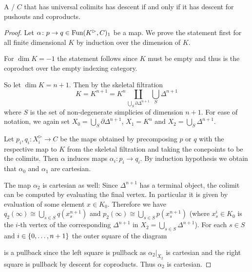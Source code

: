 \begin{lemma}\label{lem:descentIffDescentPoAndCoprod}
    A \inftycat/ $C$ that has universal colimits has descent if and only if it has descent for pushouts and coproducts.
    \begin{proof} %
        Let $\alpha\colon p\to q\in\operatorname{Fun}(K^{\rhd},C)_1$ be a map.
        We prove the statement first for all finite dimensional $K$ by induction over the dimension of $K$. %

        For $\dim K=-1$ the statement follows since $K$ must be empty and thus is the coproduct over the empty indexing category.


        So let $\dim K=n+1$.
        Then by the skeletal filtration        
        \begin{equation*}
            K=K^{n+1}=K^n\coprod\limits_{\bigcup\limits_S \partial\Delta^{n+1}}\bigcup_S \Delta^{n+1}
        \end{equation*}
        where $S$ is the set of non-degenerate simplicies of dimension $n+1$.
        For ease of notation, we again set $X_{0}=\bigcup\limits_S \partial\Delta^{n+1}$, $X_1=K^n$ and $X_2=\bigcup\limits_S \Delta^{n+1}$.
        
        Let $p_i,q_i\colon X_i^{\rhd}\to C$ be the maps obtained by precomposing $p$ or $q$ with the respective map to $K$ from the skeletal filtration and taking the conepoints to be the colimits.
        Then $\alpha$ induces maps $\alpha_i\colon p_i\to q_i$. %
        By induction hypothesis we obtain that $\alpha_0$ and $\alpha_1$ are cartesian.

        The map $\alpha_2$ is cartesian as well: 
        Since $\Delta^{n+1}$ has a terminal object, the colimit can be computed by evaluating the final vertex. 
        In particular it is given by evaluation of some element $x\in K_0$.
        Therefore we have $q_2(\infty)\cong\bigcup\limits_{s\in S} q(x_s^{n+1})$ and $p_2(\infty)\cong\bigcup\limits_{s\in S} p(x_s^{n+1})$ (where $x_s^i\in K_0$ is the $i$-th vertex of the corresponding $\Delta^{n+1}$ in $X_2=\bigcup\limits_{s\in S} \Delta^{n+1}$).
        For each $s\in S$ and $i\in\left\lbrace0,\ldots,n+1\right\rbrace$ the outer square of the diagram
        \begin{center}
        \end{center}
        is a pullback since the left square is pullback as $\alpha_2|_{X_2}$ is cartesian and the right square is pullback by descent for coproducts.
        Thus $\alpha_2$ is cartesian.


\end{proof}
\end{lemma}
